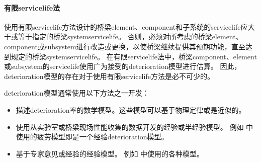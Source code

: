 \paragraph*{有限\gls*{servicelife}法}
使用有限\gls*{servicelife}方法设计的桥梁\gls*{element}、\gls*{component}和子系统的\gls*{servicelife}应大于或等于指定的桥梁\gls*{system}\gls*{servicelife}。 否则，必须对所考虑的桥梁\gls*{element}、\gls*{component}或\gls*{subsystem}进行改造或更换，以使桥梁继续提供其预期功能，直至达到规定的桥梁\gls*{system}\gls*{servicelife}。 在有限\gls*{servicelife}法中，桥梁\gls*{component}、\gls*{element}或\gls*{subsystem}的\gls*{servicelife}使用广为接受的\gls*{deterioration}模型进行估算。 因此，\gls*{deterioration}模型的存在对于使用有限\gls*{servicelife}方法是必不可少的。

\gls*{deterioration}模型通常使用以下方法之一开发：
\begin{itemize}
  \item 描述\gls*{deterioration}率的数学模型。这些模型可以基于物理定律或是近似的。
  \item 使用从实验室或桥梁现场性能收集的数据开发的经验或半经验模型。 例如 \lrfd 中使用的疲劳模型即是一个经验\gls*{deterioration}模型。
  \item 基于专家意见或经验的经验模型。 例如 \pontis 中使用的各种模型。
\end{itemize}

